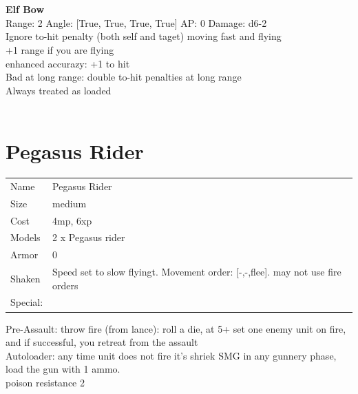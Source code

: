 \ \\

\ \\
{\bf Elf Bow } \\



Range: 2  Angle: [True, True, True, True] AP: 0 Damage: d6-2 \\
Ignore to-hit penalty (both self and taget) moving fast and flying\\ 
+1 range if you are flying\\ 
enhanced accurazy: +1 to hit\\ 
Bad at long range: double to-hit penalties at long range\\ 
Always treated as loaded\\ 




 
\ \\













\clearpage

\section{ Pegasus Rider }

\begin{tabular}{ll}
  Name & Pegasus Rider \\
  Size & medium\\
  Cost & 4mp, 6xp\\
  Models & 2 x Pegasus rider\\
  Armor & 0\\
  Shaken & Speed set to slow flyingt. Movement order: [-,-,flee]. may not use fire orders\\
  Special: \\
\end{tabular}

\noindent Pre-Assault: throw fire (from lance): roll a die, at 5+ set one enemy unit on fire, and if successful, you retreat from the assault\\ 
Autoloader: any time unit does not fire it's shriek SMG in any gunnery phase, load the gun with 1 ammo.\\ 
poison resistance 2\\ 


